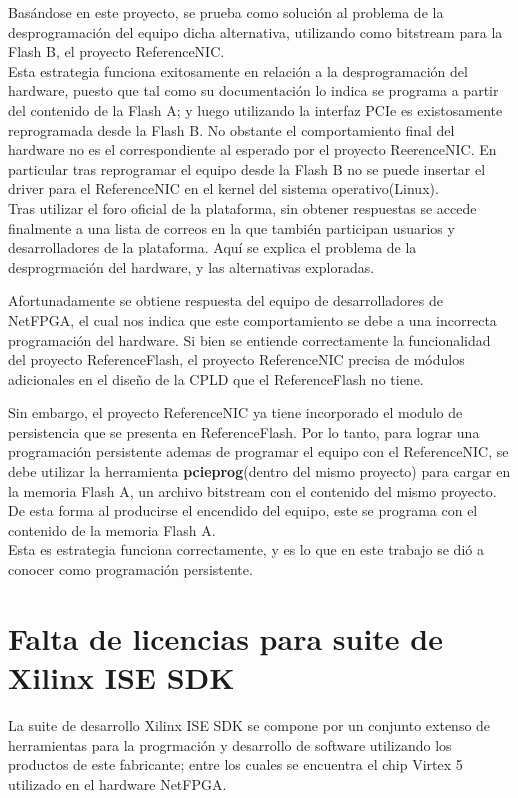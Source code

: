 Basándose en este proyecto, se prueba como solución al problema de la desprogramaci\'on del equipo dicha alternativa, utilizando como bitstream para la Flash B, el proyecto ReferenceNIC.\\

Esta estrategia funciona  exitosamente en relación a la desprogramaci\'on del hardware, puesto que tal como su documentación lo indica se programa a partir del contenido de la Flash A; y luego utilizando la interfaz PCIe es existosamente reprogramada desde la Flash B. No obstante el comportamiento final del hardware no es el correspondiente al esperado por el proyecto ReerenceNIC. En particular tras reprogramar el equipo desde la Flash B no se puede insertar el driver para el ReferenceNIC en el kernel del sistema operativo(Linux).\\

Tras utilizar el foro oficial de la plataforma, sin obtener respuestas se accede finalmente a una lista de correos en la que tambi\'en participan usuarios y desarrolladores de la plataforma. Aquí se explica el problema de la desprogrmaci\'on del hardware, y las alternativas exploradas. 

Afortunadamente se obtiene respuesta del equipo de desarrolladores de NetFPGA, el cual nos indica que este comportamiento se debe a una incorrecta programaci\'on del hardware. Si bien se entiende correctamente la funcionalidad del proyecto ReferenceFlash, el proyecto ReferenceNIC precisa de módulos adicionales en el diseño de la CPLD que el ReferenceFlash no tiene. 

Sin embargo, el proyecto ReferenceNIC ya tiene incorporado el modulo de persistencia que se presenta en ReferenceFlash. Por lo tanto, para lograr una programaci\'on persistente ademas de programar el equipo con el ReferenceNIC, se debe utilizar la herramienta \textbf{pcieprog}(dentro del mismo proyecto) para cargar en la memoria Flash A, un archivo bitstream con el contenido del mismo proyecto. De esta forma al producirse el encendido del equipo, este se programa con el contenido de la memoria Flash A.\\ 

Esta es estrategia funciona correctamente, y es lo que en este trabajo se di\'o a conocer como programación persistente.

\section{Falta de licencias para suite de Xilinx ISE SDK}
\label{apendiceB3}
La suite de desarrollo Xilinx ISE SDK se compone por un conjunto extenso de herramientas para la progrmaci\'on y desarrollo de software utilizando los productos de este fabricante; entre los cuales se encuentra el chip Virtex 5 utilizado en el hardware NetFPGA.\\

